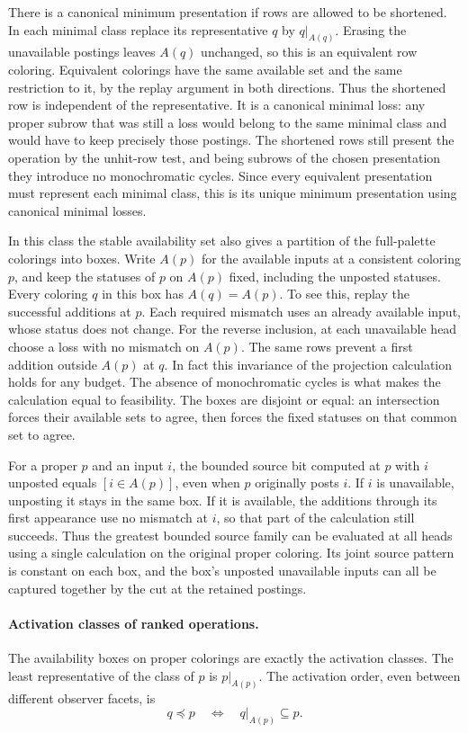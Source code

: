 There is a canonical minimum presentation if rows
are allowed to be shortened. In each minimal class
replace its representative $q$ by $q|_{A(q)}$.
Erasing the unavailable postings leaves $A(q)$
unchanged, so this is an equivalent row coloring.
Equivalent colorings have the same available set
and the same restriction to it, by the replay
argument in both directions. Thus the shortened
row is independent of the representative. It is a
canonical minimal loss: any proper subrow that was
still a loss would belong to the same minimal class
and would have to keep precisely those postings.
The shortened rows still present the operation by
the unhit-row test, and being subrows of the chosen
presentation they introduce no monochromatic cycles.
Since every equivalent presentation must represent
each minimal class, this is its unique minimum
presentation using canonical minimal losses.

In this class the stable availability set also gives a
partition of the full-palette colorings into boxes. Write
$A(p)$ for the available inputs at a consistent coloring
$p$, and keep the statuses of $p$ on $A(p)$ fixed, including
the unposted statuses. Every coloring $q$ in this box has
$A(q)=A(p)$. To see this, replay the successful additions
at $p$. Each required mismatch uses an already available
input, whose status does not change. For the reverse
inclusion, at each unavailable head choose a loss with no
mismatch on $A(p)$. The same rows prevent a first addition
outside $A(p)$ at $q$. In fact this invariance of the
projection calculation holds for any budget. The absence
of monochromatic cycles is what makes the calculation
equal to feasibility. The boxes are disjoint or equal:
an intersection forces their available sets to agree, then
forces the fixed statuses on that common set to agree.

For a proper $p$ and an input $i$, the bounded source bit
computed at $p$ with $i$ unposted equals $[i\in A(p)]$,
even when $p$ originally posts $i$. If $i$ is unavailable,
unposting it stays in the same box. If it is available,
the additions through its first appearance use no mismatch
at $i$, so that part of the calculation still succeeds.
Thus the greatest bounded source family can be evaluated
at all heads using a single calculation on the original
proper coloring. Its joint source pattern is constant on
each box, and the box's unposted unavailable inputs can
all be captured together by the cut at the retained postings.

\paragraph{Activation classes of ranked operations.}
The availability boxes on proper colorings are exactly the
activation classes. The least representative of the class
of $p$ is $p|_{A(p)}$. The activation order, even between
different observer facets, is
\[
 q\preceq p\quad\Longleftrightarrow\quad
 q|_{A(p)}\subseteq p .
\]

